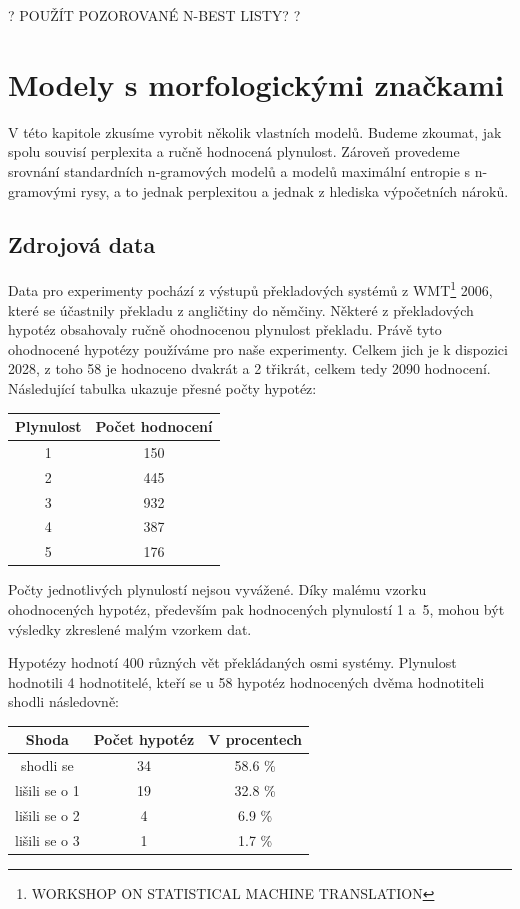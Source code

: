 \documentclass[12pt,a4paper]{report}
\begin{document}
? POUŽÍT POZOROVANÉ N-BEST LISTY? ?



\chapter{Modely s morfologickými značkami}
V této kapitole zkusíme vyrobit několik vlastních modelů. Budeme zkoumat, jak spolu souvisí perplexita a ručně hodnocená plynulost. Zároveň provedeme srovnání standardních n-gramových modelů a modelů maximální entropie s n-gramovými rysy, a to jednak perplexitou a jednak z hlediska výpočetních nároků.

\section{Zdrojová data}
Data pro experimenty pochází z výstupů překladových systémů z WMT\footnote{WORKSHOP ON STATISTICAL MACHINE TRANSLATION} 2006, které se účastnily překladu z angličtiny do němčiny. Některé z překladových hypotéz obsahovaly ručně ohodnocenou plynulost překladu. Právě tyto ohodnocené hypotézy používáme pro naše experimenty. Celkem jich je k dispozici 2028, z toho 58 je hodnoceno dvakrát a 2 třikrát, celkem tedy 2090 hodnocení. Následující tabulka ukazuje přesné počty hypotéz:

\begin{center}\begin{tabular}{|c|c|}
	\hline
	\textbf{Plynulost} & \textbf{Počet hodnocení}\\
	\hline
	1 & 150\\
	\hline
	2 & 445\\
	\hline
	3 & 932\\
	\hline
	4 & 387\\
	\hline
	5 & 176\\
	\hline
\end{tabular}\end{center}


Počty jednotlivých plynulostí nejsou vyvážené. Díky malému vzorku ohodnocených hypotéz, především pak hodnocených plynulostí 1 a~5, mohou být výsledky zkreslené malým vzorkem dat.

Hypotézy hodnotí 400 různých vět překládaných osmi systémy. Plynulost hodnotili 4 hodnotitelé, kteří se u 58 hypotéz hodnocených dvěma hodnotiteli shodli následovně:

\begin{center}\begin{tabular}{|c|c|c|}
	\hline
	\textbf{Shoda} & \textbf{Počet hypotéz} & \textbf{V procentech}\\
	\hline
	shodli se & 34 & 58.6 \%\\
	\hline
	lišili se o 1 & 19 & 32.8 \%\\
	\hline
	lišili se o 2 & 4 & 6.9 \%\\
	\hline
	lišili se o 3 & 1 & 1.7 \%\\
	\hline
\end{tabular}\end{center}
\end{document}
